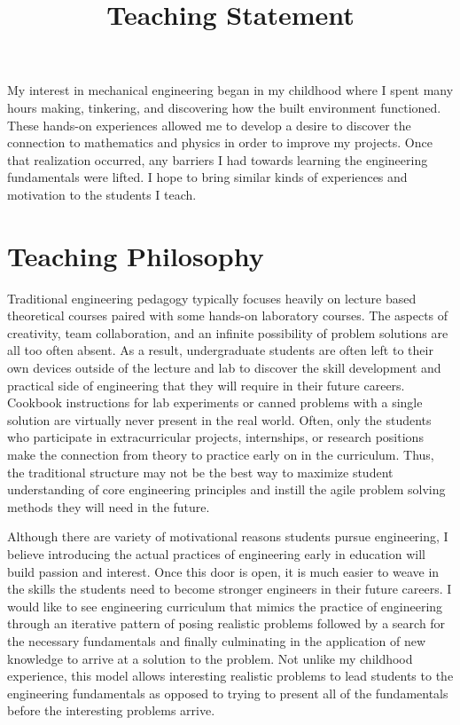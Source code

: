 \documentclass{article}
\title{Teaching Statement}
\date{}
\begin{document}

My interest in mechanical engineering began in my childhood where I spent many
hours making, tinkering, and discovering how the built environment functioned.
These hands-on experiences allowed me to develop a desire to discover the
connection to mathematics and physics in order to improve my projects. Once
that realization occurred, any barriers I had towards learning the engineering
fundamentals were lifted. I hope to bring similar kinds of experiences and
motivation to the students I teach.

\section*{Teaching Philosophy}
%
Traditional engineering pedagogy typically focuses heavily on lecture based
theoretical courses paired with some hands-on laboratory courses. The aspects of
creativity, team collaboration, and an infinite possibility of problem
solutions are all too often absent. As a result, undergraduate students are
often left to their own devices outside of the lecture and lab to discover the
skill development and practical side of engineering that they will require in
their future careers. Cookbook instructions for lab experiments or canned
problems with a single solution are virtually never present in the real world.
Often, only the students who participate in extracurricular projects,
internships, or research positions make the connection from theory to practice
early on in the curriculum. Thus, the traditional structure may not be the best
way to maximize student understanding of core engineering principles and
instill the agile problem solving methods they will need in the future.

Although there are variety of motivational reasons students pursue engineering,
I believe introducing the actual practices of engineering early in education
will build passion and interest. Once this door is open, it is much easier to
weave in the skills the students need to become stronger engineers in their
future careers. I would like to see engineering curriculum that mimics the
practice of engineering through an iterative pattern of posing realistic
problems followed by a search for the necessary fundamentals and finally
culminating in the application of new knowledge to arrive at a solution to
the problem. Not unlike my childhood experience, this model allows interesting
realistic problems to lead students to the engineering fundamentals as opposed
to trying to present all of the fundamentals before the interesting problems
arrive.
\end{document}
